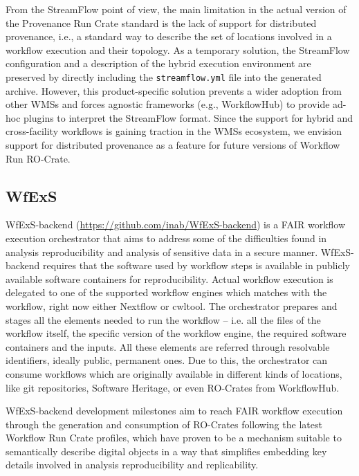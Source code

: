 \documentclass[10pt,letterpaper]{article}
\begin{document}
From the StreamFlow point of view, the main limitation in the actual version of the Provenance Run Crate standard is the lack of support for distributed provenance, i.e., a standard way to describe the set of locations involved in a workflow execution and their topology. As a temporary solution,
the StreamFlow configuration and a description of the hybrid execution environment are preserved by directly including the \texttt{streamflow.yml} file into the generated archive.
However, this product-specific solution prevents a wider adoption from other WMSs and forces agnostic frameworks (e.g., WorkflowHub) to provide ad-hoc plugins to interpret the StreamFlow format.
Since the support for hybrid and cross-facility workflows is gaining traction in the WMSs ecosystem, we envision support for distributed provenance as a feature for future versions of Workflow Run RO-Crate.

\subsection{WfExS}\label{wfexs}

WfExS-backend (\url{https://github.com/inab/WfExS-backend}) is a FAIR workflow execution orchestrator that aims to address some of the difficulties found in analysis reproducibility and analysis of sensitive data in a secure manner.
WfExS-backend requires that the software used by workflow steps is available in publicly available software containers for reproducibility.
Actual workflow execution is delegated to one of the supported workflow engines which matches with the workflow, right now either Nextflow or cwltool.
The orchestrator prepares and stages all the elements needed to run the workflow – i.e. all the files of the workflow itself, the specific version of the workflow engine, the required software containers and the inputs.
All these elements are referred through resolvable identifiers, ideally public, permanent ones.
Due to this, the orchestrator can consume workflows which are originally available in different kinds of locations, like git repositories, Software Heritage, or even RO-Crates from WorkflowHub.

WfExS-backend development milestones aim to reach FAIR workflow execution through the generation and consumption of RO-Crates following the latest Workflow Run Crate profiles, which have proven to be a mechanism suitable to semantically describe digital objects in a way that simplifies embedding key details involved in analysis reproducibility and replicability.
\end{document}
